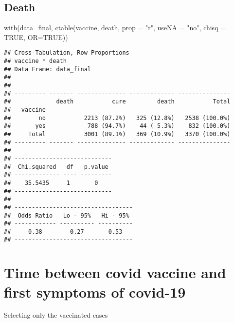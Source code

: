 \documentclass[
]{article}
\newenvironment{Shaded}{\begin{snugshade}}{\end{snugshade}}
\newcommand{\AttributeTok}[1]{\textcolor[rgb]{0.77,0.63,0.00}{#1}}
\newcommand{\ConstantTok}[1]{\textcolor[rgb]{0.00,0.00,0.00}{#1}}
\newcommand{\FunctionTok}[1]{\textcolor[rgb]{0.00,0.00,0.00}{#1}}
\newcommand{\NormalTok}[1]{#1}
\newcommand{\OtherTok}[1]{\textcolor[rgb]{0.56,0.35,0.01}{#1}}
\newcommand{\SpecialCharTok}[1]{\textcolor[rgb]{0.00,0.00,0.00}{#1}}
\newcommand{\StringTok}[1]{\textcolor[rgb]{0.31,0.60,0.02}{#1}}
\begin{document}
\hypertarget{death}{%
\subsection{Death}\label{death}}

\begin{Shaded}
\begin{Highlighting}[]
\FunctionTok{with}\NormalTok{(data\_final, }\FunctionTok{ctable}\NormalTok{(vaccine, death, }\AttributeTok{prop =} \StringTok{"r"}\NormalTok{, }\AttributeTok{useNA =} \StringTok{"no"}\NormalTok{, }\AttributeTok{chisq =} \ConstantTok{TRUE}\NormalTok{, }\AttributeTok{OR=}\ConstantTok{TRUE}\NormalTok{))}
\end{Highlighting}
\end{Shaded}

\begin{verbatim}
## Cross-Tabulation, Row Proportions  
## vaccine * death  
## Data Frame: data_final  
## 
## 
## --------- ------- -------------- ------------- ---------------
##             death           cure         death           Total
##   vaccine                                                     
##        no           2213 (87.2%)   325 (12.8%)   2538 (100.0%)
##       yes            788 (94.7%)    44 ( 5.3%)    832 (100.0%)
##     Total           3001 (89.1%)   369 (10.9%)   3370 (100.0%)
## --------- ------- -------------- ------------- ---------------
## 
## ----------------------------
##  Chi.squared   df   p.value 
## ------------- ---- ---------
##    35.5435     1       0    
## ----------------------------
## 
## ----------------------------------
##  Odds Ratio   Lo - 95%   Hi - 95% 
## ------------ ---------- ----------
##     0.38        0.27       0.53   
## ----------------------------------
\end{verbatim}

\hypertarget{time-between-covid-vaccine-and-first-symptoms-of-covid-19}{%
\section{Time between covid vaccine and first symptoms of
covid-19}\label{time-between-covid-vaccine-and-first-symptoms-of-covid-19}}

Selecting only the vaccinated cases

\begin{Shaded}
\end{Shaded}
\end{document}
